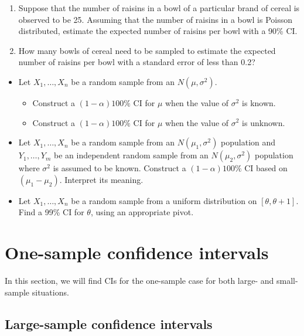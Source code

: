 \begin{enumerate}
    \item[\textbf{(b)}] Suppose that the number of raisins in a bowl of a particular brand of cereal is observed to be 25. Assuming that the number of raisins in a bowl is Poisson distributed, estimate the expected number of raisins per bowl with a 90\% CI.
    \item[\textbf{(c)}] How many bowls of cereal need to be sampled to estimate the expected number of raisins per bowl with a standard error of less than 0.2?
\end{enumerate}

\begin{itemize}
    \item[\textbf{5.4.9.}] Let $X_1, \ldots, X_n$ be a random sample from an $N(\mu, \sigma^2)$.
    \begin{itemize}
        \item[\textbf{(a)}] Construct a $(1 - \alpha)100\%$ CI for $\mu$ when the value of $\sigma^2$ is known.
        \item[\textbf{(b)}] Construct a $(1 - \alpha)100\%$ CI for $\mu$ when the value of $\sigma^2$ is unknown.
    \end{itemize}
    \item[\textbf{5.4.10.}] Let $X_1, \ldots, X_n$ be a random sample from an $N(\mu_1, \sigma^2)$ population and $Y_1, \ldots, Y_m$ be an independent random sample from an $N(\mu_2, \sigma^2)$ population where $\sigma^2$ is assumed to be known. Construct a $(1 - \alpha)100\%$ CI based on $(\mu_1 - \mu_2)$. Interpret its meaning.
    \item[\textbf{5.4.11.}] Let $X_1, \ldots, X_n$ be a random sample from a uniform distribution on $[\theta, \theta + 1]$. Find a 99\% CI for $\theta$, using an appropriate pivot.
\end{itemize}

\section{One-sample confidence intervals}

In this section, we will find CIs for the one-sample case for both large- and small-sample situations.

\subsection{Large-sample confidence intervals}

